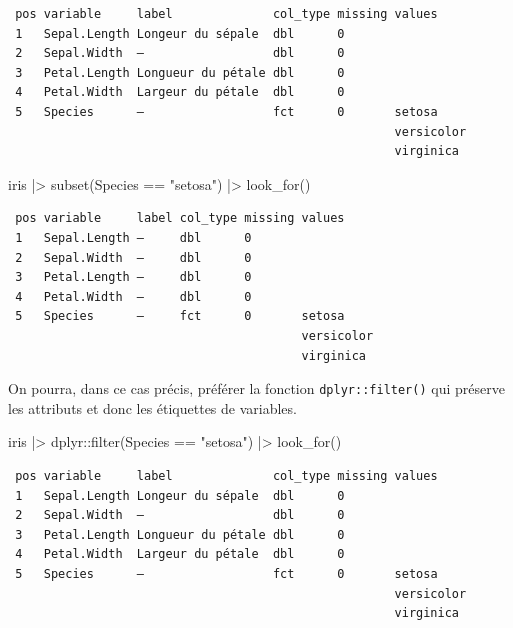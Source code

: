 \documentclass[
  letterpaper,
  DIV=11,
  numbers=noendperiod,
  oneside]{scrreprt}
\newenvironment{Shaded}{\begin{snugshade}}{\end{snugshade}}
\newcommand{\FunctionTok}[1]{\textcolor[rgb]{0.28,0.35,0.67}{#1}}
\newcommand{\NormalTok}[1]{\textcolor[rgb]{0.00,0.23,0.31}{#1}}
\newcommand{\SpecialCharTok}[1]{\textcolor[rgb]{0.37,0.37,0.37}{#1}}
\newcommand{\StringTok}[1]{\textcolor[rgb]{0.13,0.47,0.30}{#1}}
\begin{document}
\begin{verbatim}
 pos variable     label              col_type missing values    
 1   Sepal.Length Longeur du sépale  dbl      0                 
 2   Sepal.Width  —                  dbl      0                 
 3   Petal.Length Longueur du pétale dbl      0                 
 4   Petal.Width  Largeur du pétale  dbl      0                 
 5   Species      —                  fct      0       setosa    
                                                      versicolor
                                                      virginica 
\end{verbatim}

\begin{Shaded}
\begin{Highlighting}[]
\NormalTok{iris }\SpecialCharTok{|\textgreater{}} 
  \FunctionTok{subset}\NormalTok{(Species }\SpecialCharTok{==} \StringTok{"setosa"}\NormalTok{) }\SpecialCharTok{|\textgreater{}} 
  \FunctionTok{look\_for}\NormalTok{()}
\end{Highlighting}
\end{Shaded}

\begin{verbatim}
 pos variable     label col_type missing values    
 1   Sepal.Length —     dbl      0                 
 2   Sepal.Width  —     dbl      0                 
 3   Petal.Length —     dbl      0                 
 4   Petal.Width  —     dbl      0                 
 5   Species      —     fct      0       setosa    
                                         versicolor
                                         virginica 
\end{verbatim}

On pourra, dans ce cas précis, préférer la fonction
\texttt{dplyr::filter()} qui préserve les attributs et donc les
étiquettes de variables.

\begin{Shaded}
\begin{Highlighting}[]
\NormalTok{iris }\SpecialCharTok{|\textgreater{}} 
\NormalTok{  dplyr}\SpecialCharTok{::}\FunctionTok{filter}\NormalTok{(Species }\SpecialCharTok{==} \StringTok{"setosa"}\NormalTok{) }\SpecialCharTok{|\textgreater{}} 
  \FunctionTok{look\_for}\NormalTok{()}
\end{Highlighting}
\end{Shaded}

\begin{verbatim}
 pos variable     label              col_type missing values    
 1   Sepal.Length Longeur du sépale  dbl      0                 
 2   Sepal.Width  —                  dbl      0                 
 3   Petal.Length Longueur du pétale dbl      0                 
 4   Petal.Width  Largeur du pétale  dbl      0                 
 5   Species      —                  fct      0       setosa    
                                                      versicolor
                                                      virginica 
\end{verbatim}
\end{document}
